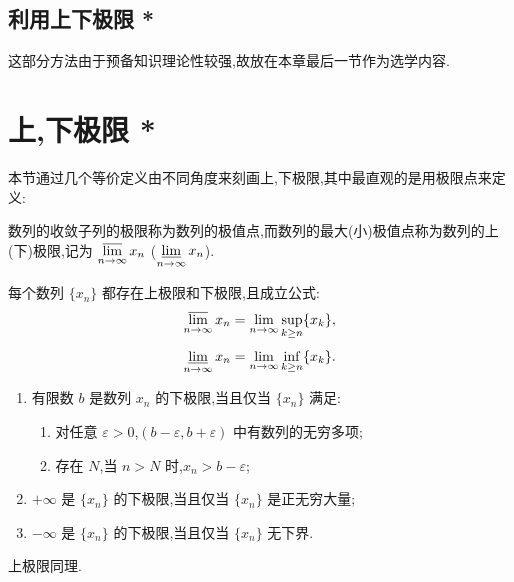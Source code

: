 \subsection{利用上下极限 *}

这部分方法由于预备知识理论性较强,故放在本章最后一节作为选学内容.


\newpage

\section{上,下极限 *}

本节通过几个等价定义由不同角度来刻画上,下极限,其中最直观的是用极限点来定义:

\begin{definition}
  数列的收敛子列的极限称为数列的极值点,而数列的最大(小)极值点称为数列的上(下)极限,记为
  $\displaystyle \varlimsup\limits_{n\to\infty}x_n$
  ($\displaystyle \varliminf\limits_{n\to\infty}x_n$).
\end{definition}

\begin{proposition}
  每个数列 $\{x_n\}$ 都存在上极限和下极限,且成立公式:
  \[
    \varlimsup\limits_{n\to\infty}x_n
    =
    \lim\limits_{n\to\infty}\sup_{k\geq n}\{x_k\},
  \]
  \[
    \varliminf\limits_{n\to\infty}x_n
    =
    \lim\limits_{n\to\infty}\inf_{k\geq n}\{x_k\}.
  \]
\end{proposition}

\begin{proposition}
  \leavevmode
  \begin{enumerate}
    \item 有限数 $b$ 是数列 $x_n$ 的下极限,当且仅当 $\{x_n\}$ 满足:
          \begin{enumerate}[label=(\roman*)]
            \item 对任意 $\varepsilon>0$,$(b-\varepsilon,b+\varepsilon)$ 中有数列的无穷多项;
            \item 存在 $N$,当 $n>N$ 时,$x_n>b-\varepsilon$;
          \end{enumerate}
    \item $+\infty$ 是 $\{x_n\}$ 的下极限,当且仅当 $\{x_n\}$ 是正无穷大量;
    \item $-\infty$ 是 $\{x_n\}$ 的下极限,当且仅当 $\{x_n\}$ 无下界.
  \end{enumerate}
  上极限同理.
\end{proposition}

